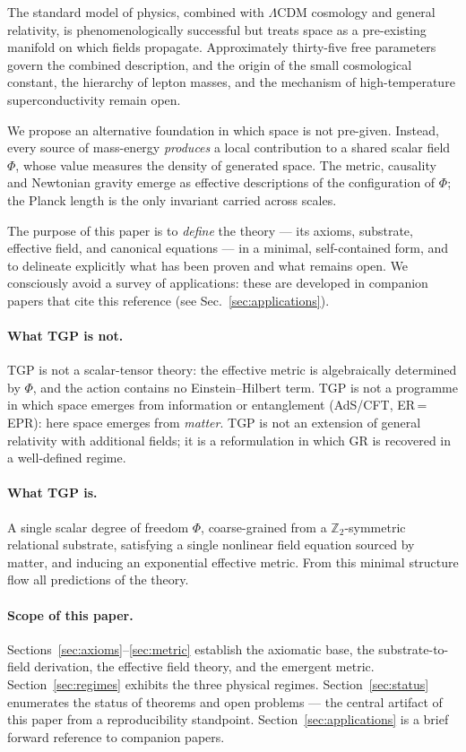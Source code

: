 \documentclass[11pt,a4paper]{article}
\renewcommand{\Phi}{\varPhi}
\newcommand{\Zp}{\mathbb{Z}_{2}}
\begin{document}
The standard model of physics, combined with $\Lambda$CDM cosmology and
general relativity, is phenomenologically successful but treats space as
a pre-existing manifold on which fields propagate. Approximately thirty-five
free parameters govern the combined description, and the origin of the
small cosmological constant, the hierarchy of lepton masses, and the
mechanism of high-temperature superconductivity remain open.

We propose an alternative foundation in which space is not pre-given.
Instead, every source of mass-energy \emph{produces} a local contribution
to a shared scalar field $\Phi$, whose value measures the density of generated
space. The metric, causality and Newtonian gravity emerge as effective
descriptions of the configuration of $\Phi$; the Planck length is the only
invariant carried across scales.

The purpose of this paper is to \emph{define} the theory --- its axioms,
substrate, effective field, and canonical equations --- in a minimal,
self-contained form, and to delineate explicitly what has been proven and
what remains open. We consciously avoid a survey of applications: these are
developed in companion papers that cite this reference (see
Sec.~\ref{sec:applications}).

\paragraph{What TGP is not.} TGP is not a scalar-tensor theory: the
effective metric is algebraically determined by $\Phi$, and the action
contains no Einstein--Hilbert term. TGP is not a programme in which space
emerges from information or entanglement (AdS/CFT, ER\,=\,EPR): here space
emerges from \emph{matter}. TGP is not an extension of general relativity
with additional fields; it is a reformulation in which GR is recovered in
a well-defined regime.

\paragraph{What TGP is.} A single scalar degree of freedom $\Phi$,
coarse-grained from a $\Zp$-symmetric relational substrate, satisfying a
single nonlinear field equation sourced by matter, and inducing an
exponential effective metric. From this minimal structure flow all
predictions of the theory.

\paragraph{Scope of this paper.} Sections~\ref{sec:axioms}--\ref{sec:metric}
establish the axiomatic base, the substrate-to-field derivation, the
effective field theory, and the emergent metric. Section~\ref{sec:regimes}
exhibits the three physical regimes. Section~\ref{sec:status} enumerates the
status of theorems and open problems --- the central artifact of this paper
from a reproducibility standpoint. Section~\ref{sec:applications} is a brief
forward reference to companion papers.
\end{document}
